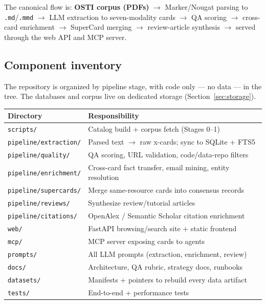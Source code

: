 \documentclass[11pt,letterpaper]{article}
\newcommand{\code}[1]{\texttt{\small #1}}
\begin{document}
The canonical flow is: \textbf{OSTI corpus (PDFs)} $\rightarrow$ Marker/Nougat
parsing to \code{.md}/\code{.mmd} $\rightarrow$ LLM extraction to seven-modality
cards $\rightarrow$ QA scoring $\rightarrow$ cross-card enrichment $\rightarrow$
SuperCard merging $\rightarrow$ review-article synthesis $\rightarrow$ served through
the web API and MCP server.

\subsection{Component inventory}

The repository is organized by pipeline stage, with code only --- no data --- in the
tree. The databases and corpus live on dedicated storage (Section~\ref{sec:storage}).

\begin{center}
\small
\begin{tabular}{@{}l p{9.4cm}@{}}
\toprule
\textbf{Directory} & \textbf{Responsibility} \\
\midrule
\code{scripts/}              & Catalog build + corpus fetch (Stages 0--1) \\
\code{pipeline/extraction/}  & Parsed text $\rightarrow$ raw x-cards; sync to SQLite + FTS5 \\
\code{pipeline/quality/}     & QA scoring, URL validation, code/data-repo filters \\
\code{pipeline/enrichment/}  & Cross-card fact transfer, email mining, entity resolution \\
\code{pipeline/supercards/}  & Merge same-resource cards into consensus records \\
\code{pipeline/reviews/}     & Synthesize review/tutorial articles \\
\code{pipeline/citations/}   & OpenAlex / Semantic Scholar citation enrichment \\
\code{web/}                  & FastAPI browsing/search site + static frontend \\
\code{mcp/}                  & MCP server exposing cards to agents \\
\code{prompts/}              & All LLM prompts (extraction, enrichment, review) \\
\code{docs/}                 & Architecture, QA rubric, strategy docs, runbooks \\
\code{datasets/}             & Manifests + pointers to rebuild every data artifact \\
\code{tests/}                & End-to-end + performance tests \\
\bottomrule
\end{tabular}
\end{center}
\end{document}
